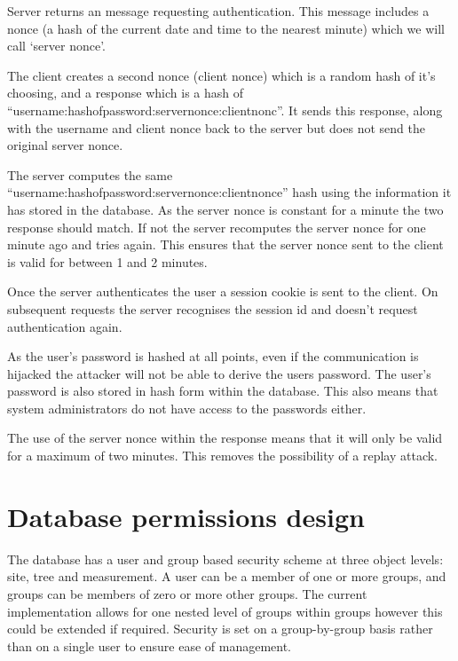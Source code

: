 \begin{itemize*}
 \item Server returns an message requesting authentication. This message includes a nonce (a hash of the current date and time to the nearest minute) which we will call `server nonce'.
 \item The client creates a second nonce (client nonce) which is a random hash of it's choosing, and a response which is a hash of ``username:hashofpassword:servernonce:clientnonc''. It sends this response, along with the username and client nonce back to the server but does not send the original server nonce.
 \item The server computes the same ``username:hashofpassword:servernonce:clientnonce'' hash using the information it has stored in the database. As the server nonce is constant for a minute the two response should match. If not the server recomputes the server nonce for one minute ago and tries again. This ensures that the server nonce sent to the client is valid for between 1 and 2 minutes.
 \item Once the server authenticates the user a session cookie is sent to the client. On subsequent requests the server recognises the session id and doesn't request authentication again. 
\end{itemize*}

As the user's password is hashed at all points, even if the communication is hijacked the attacker will not be able to derive the users password. The user's password is also stored in hash form within the database. This also means that system administrators do not have access to the passwords either.

The use of the server nonce within the response means that it will only be valid for a maximum of two minutes. This removes the possibility of a replay attack. 


\section{Database permissions design}
The database has a user and group based security scheme at three object levels: site, tree and measurement. A user can be a member of one or more groups, and groups can be members of zero or more other groups. The current implementation allows for one nested level of groups within groups however this could be extended if required. Security is set on a group-by-group basis rather than on a single user to ensure ease of management.

